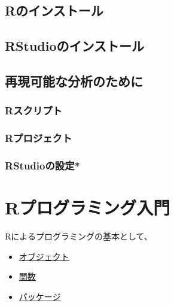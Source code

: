 \documentclass[]{bxjsarticle}
\providecommand{\tightlist}{%
  \setlength{\itemsep}{0pt}\setlength{\parskip}{0pt}}
\begin{document}
\hypertarget{rux306eux30a4ux30f3ux30b9ux30c8ux30fcux30eb}{%
\subsection{Rのインストール}\label{rux306eux30a4ux30f3ux30b9ux30c8ux30fcux30eb}}

\hypertarget{rstudioux306eux30a4ux30f3ux30b9ux30c8ux30fcux30eb}{%
\subsection{RStudioのインストール}\label{rstudioux306eux30a4ux30f3ux30b9ux30c8ux30fcux30eb}}

\hypertarget{ux518dux73feux53efux80fdux306aux5206ux6790ux306eux305fux3081ux306b}{%
\subsection{再現可能な分析のために}\label{ux518dux73feux53efux80fdux306aux5206ux6790ux306eux305fux3081ux306b}}

\hypertarget{rux30b9ux30afux30eaux30d7ux30c8}{%
\subsubsection{Rスクリプト}\label{rux30b9ux30afux30eaux30d7ux30c8}}

\hypertarget{rux30d7ux30edux30b8ux30a7ux30afux30c8}{%
\subsubsection{Rプロジェクト}\label{rux30d7ux30edux30b8ux30a7ux30afux30c8}}

\hypertarget{rstudioux306eux8a2dux5b9a}{%
\subsubsection{RStudioの設定*}\label{rstudioux306eux8a2dux5b9a}}

\hypertarget{intro-r}{%
\section{Rプログラミング入門}\label{intro-r}}

Rによるプログラミングの基本として、

\begin{itemize}
\tightlist
\item
  \protect\hyperlink{ux30aaux30d6ux30b8ux30a7ux30afux30c8}{オブジェクト}
\item
  \protect\hyperlink{ux95a2ux6570}{関数}
\item
  \protect\hyperlink{ux30d1ux30c3ux30b1ux30fcux30b8}{パッケージ}
\end{itemize}
\end{document}
